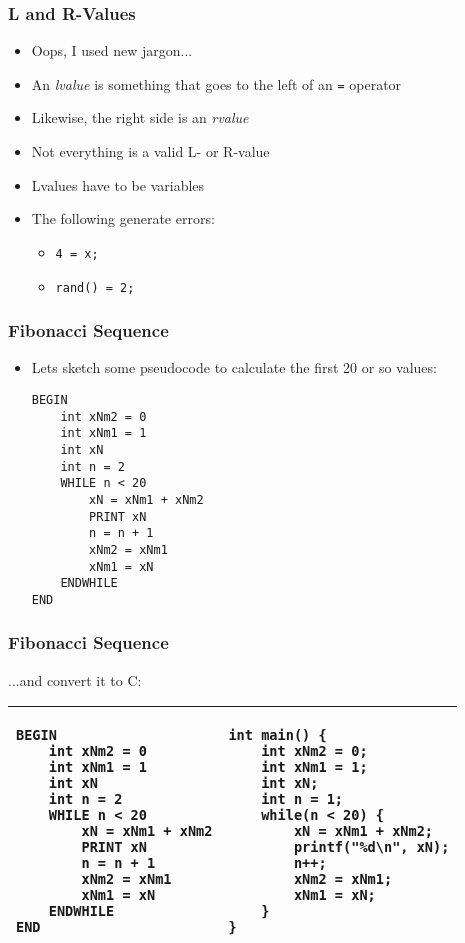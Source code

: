 \documentclass[14pt]{beamer}
\begin{document}
\begin{frame}
\frametitle{L and R-Values}
\begin{itemize}
\item Oops, I used new jargon...
\item An \textit{lvalue} is something that goes to the left of an \texttt{=} operator
\item Likewise, the right side is an \textit{rvalue}
\item Not everything is a valid L- or R-value
\item Lvalues have to be variables
\item The following generate errors:
	\begin{itemize}
		\item \texttt{4 = x;}
		\item \texttt{rand() = 2;}
	\end{itemize}
\end{itemize}
\end{frame}

\begin{frame}[fragile]
\frametitle{Fibonacci Sequence}
\begin{itemize}
	\item Lets sketch some pseudocode to calculate the first 20 or so values:
	\begin{lstlisting}[style=pseudo]
BEGIN
	int xNm2 = 0
	int xNm1 = 1
	int xN
	int n = 2
	WHILE n < 20
		xN = xNm1 + xNm2
		PRINT xN
		n = n + 1
		xNm2 = xNm1
		xNm1 = xN
	ENDWHILE
END
	\end{lstlisting}
\end{itemize}
\end{frame}

\begin{frame}[fragile]
\frametitle{Fibonacci Sequence}
...and convert it to C:
\begin{table}[H]
\centering

\begin{tabular}{ll}
\hline

\begin{lstlisting}[style=pseudo,basicstyle=\ttfamily\footnotesize]
BEGIN
	int xNm2 = 0
	int xNm1 = 1
	int xN
	int n = 2
	WHILE n < 20
		xN = xNm1 + xNm2
		PRINT xN
		n = n + 1
		xNm2 = xNm1
		xNm1 = xN
	ENDWHILE
END
\end{lstlisting} &

\begin{lstlisting}[style=Ctable,basicstyle=\ttfamily\footnotesize]
int main() {
	int xNm2 = 0;
	int xNm1 = 1;
	int xN;
	int n = 1;
	while(n < 20) {
		xN = xNm1 + xNm2;
		printf("%d\n", xN);
		n++;
		xNm2 = xNm1;
		xNm1 = xN;
	}
}
\end{lstlisting}
\\

\hline
\end{tabular}
\end{table}
\end{frame}
\end{document}
